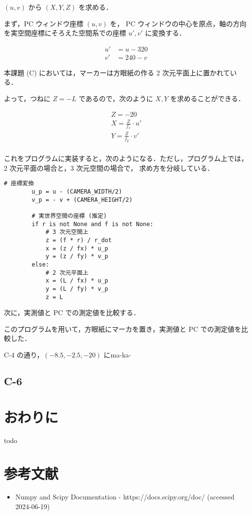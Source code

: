 \documentclass[fleqn, a4paper. 12pt]{jsarticle}
\begin{document}
      \( (u, v) \) から \( (X, Y, Z) \) を求める．

      まず，PC ウィンドウ座標 \( (u, v) \) を， PC ウィンドウの中心を原点，軸の方向を実空間座標にそろえた空間系での座標 \(u', v'\) に変換する．

      \begin{align*}
        u' &= u - 320 \\
        v' &= 240 - v
      \end{align*}

      本課題 (C) においては，マーカーは方眼紙の作る 2 次元平面上に置かれている．

      よって，つねに \( Z = -L \) であるので，次のように \( X, Y \) を求めることができる．

      \begin{align*}
        Z = -20 \\
        X = \frac{Z}{f_x} \cdot u' \\
        Y = \frac{Z}{f_y} \cdot v' \\
      \end{align*}

      これをプログラムに実装すると，次のようになる．ただし，プログラム上では，2 次元平面の場合と，3 次元空間の場合で， 求め方を分岐している．

      \begin{lstlisting}[caption={\( X, Y, Z \) を求める},label={code:1}]
        # 座標変換
        u_p = u - (CAMERA_WIDTH/2)
        v_p = - v + (CAMERA_HEIGHT/2)
        
        # 実世界空間の座標 (推定)
        if r is not None and f is not None:
            # 3 次元空間上
            z = (f * r) / r_dot 
            x = (z / fx) * u_p
            y = (z / fy) * v_p
        else:
            # 2 次元平面上
            x = (L / fx) * u_p
            y = (L / fy) * v_p    
            z = L   
      \end{lstlisting}

      次に，実測値と PC での測定値を比較する．

      このプログラムを用いて，方眼紙にマーカを置き，実測値と PC での測定値を比較した．

      C-4 の通り，\( (-8.5, -2.5, -20) \) にma-ka-

  \subsection*{C-6}





  \newpage

  \section*{おわりに}

    todo

  \newpage
  
  \section*{参考文献}

    \begin{itemize}
        \item Numpy and Scipy Documentation - https://docs.scipy.org/doc/ (accessed 2024-06-19)
    \end{itemize}
\end{document}
